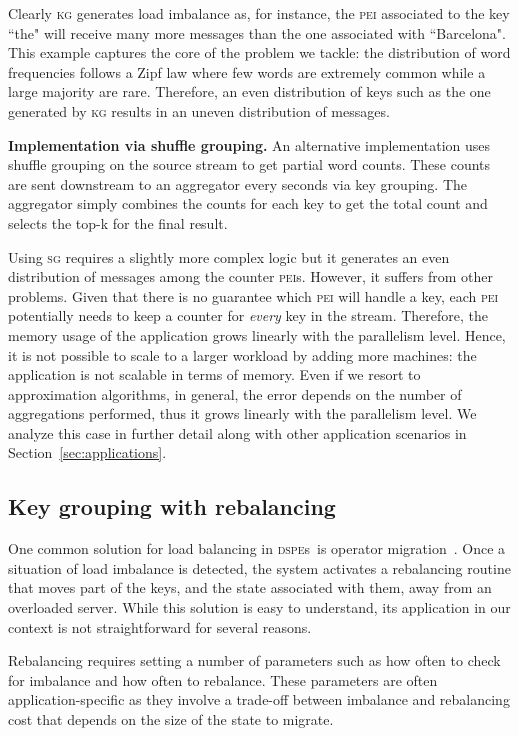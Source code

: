 \documentclass[10pt,conference,letterpaper]{IEEEtran}
\newcommand{\spara}[1]{\smallskip\noindent\textbf{#1}}
\newcommand{\pei}{\textsc{pei}\xspace}
\newcommand{\peis}{{\pei}s\xspace}
\newcommand{\dspe}{\textsc{dspe}\xspace}
\newcommand{\dspes}{{\dspe}s\xspace}
\newcommand{\kg}{\textsc{kg}\xspace}
\newcommand{\sg}{\textsc{sg}\xspace}
\begin{document}
Clearly \kg generates load imbalance as, for instance, the \pei associated to the key ``the" will receive many more messages than the one associated with ``Barcelona".
This example captures the core of the problem we tackle: the distribution of word frequencies follows a Zipf law where few words are extremely common while a large majority are rare.
Therefore, an even distribution of keys such as the one generated by \kg results in an uneven distribution of messages.

\spara{Implementation via shuffle grouping.} An alternative implementation uses shuffle grouping on the source stream to get partial word counts.
These counts are sent downstream to an aggregator every  seconds via key grouping.
The aggregator simply combines the counts for each key to get the total count and selects the top-k for the final result.


Using \sg requires a slightly more complex logic but it generates an even distribution of messages among the counter \peis.
However, it suffers from other problems.
Given that there is no guarantee which \pei will handle a key, each \pei potentially needs to keep a counter for \emph{every} key in the stream.
Therefore, the memory usage of the application grows linearly with the parallelism level.
Hence, it is not possible to scale to a larger workload by adding more machines: the application is not scalable in terms of memory.
Even if we resort to approximation algorithms, in general, the error depends on the number of aggregations performed, thus it grows linearly with the parallelism level.
We analyze this case in further detail along with other application scenarios in Section~\ref{sec:applications}.



\subsection{Key grouping with rebalancing}
One common solution for load balancing in \dspes\ is operator migration~\citep{shah2003flux,cherniack2003scalable,xing2005dynamic,gedik2013partitioning,balkesen2013adaptive,castro2013integrating}.
Once a situation of load imbalance is detected, the system activates a rebalancing routine that moves part of the keys, and the state associated with them, away from an overloaded server.
While this solution is easy to understand, its application in our context is not straightforward for several reasons.



Rebalancing requires setting a number of parameters such as how often to check for imbalance and how often to rebalance.
These parameters are often application-specific as they involve a trade-off between imbalance and rebalancing cost that depends on the size of the state to migrate. 
\end{document}
